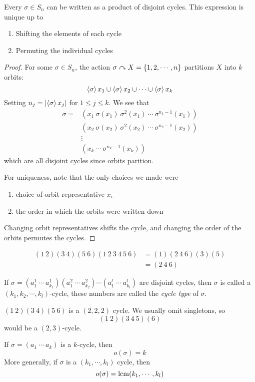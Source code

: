 \documentclass{article}
\begin{document}
\begin{thm}
    Every $\sigma \in S_n$ can be written as a product of disjoint cycles. This expression is unique up to
    \begin{enumerate}
        \item Shifting the elements of each cycle
        \item Permuting the individual cycles
    \end{enumerate}
\end{thm}
\begin{proof}
    For some $\sigma \in S_n$, the action $\sigma \curvearrowright X = \{1, 2, \cdots, n \}$ partitions $X$ into $k$ orbits:
    \[
        \left\langle \sigma\right\rangle x_1 \cup \left\langle \sigma\right\rangle x_2 \cup \cdots \cup \left\langle \sigma\right\rangle x_k
    \]
    Setting $n_j = \left\lvert  \left\langle \sigma\right\rangle x_j \right\rvert$ for $1 \leq j \leq k$. We see that
    \begin{align*}
        \sigma = &(x_1 \ \sigma(x_1) \ \sigma^2(x_1) \  \cdots \ \sigma^{n_1 -1}(x_1)) \\
        &(x_2 \ \sigma(x_2) \ \sigma^2(x_2) \ \cdots \ \sigma^{n_2 - 1}(x_2)) \\
        &\vdots \\
        &(x_k \ \cdots \ \sigma^{n_k - 1}(x_k))
    \end{align*}
    which are all disjoint cycles since orbits parition.

    For uniqueness, note that the only choices we made were
    \begin{enumerate}
        \item choice of orbit representative $x_i$
        \item the order in which the orbits were written down
    \end{enumerate}
    Changing orbit representatives shifts the cycle, and changing the order of the orbits permutes the cycles.
\end{proof}
\begin{eg}
    \begin{align*}
        (1 \ 2)(3 \ 4)(5 \ 6)(1 \ 2 \ 3 \ 4 \ 5 \ 6) &= (1)(2 \ 4 \ 6)(3)(5) \\
        &= (2 \ 4 \ 6)
    \end{align*}
\end{eg}

\begin{defi}
    If $\sigma = (a^1_1\  \cdots\ a^1_{k_1})(a^2_1\ \cdots\ a^2_{k_2}) \cdots (a^l_1\ \cdots\ a^l_{k_l})$ are disjoint cycles, then $\sigma$ is called a $(k_1, k_2, \cdots, k_l)$-cycle,
    these numbers are called the \emph{cycle type} of $\sigma$. 
\end{defi}
\begin{eg}
    $(1\ 2)(3\ 4)(5\ 6)$ is a $(2, 2, 2)$ cycle. We usually omit singletons, so 
    \[
        (1\ 2)(3\ 4\ 5)(6)  
    \]
    would be a $(2, 3)$-cycle.
\end{eg}
\begin{remark}
    If $\sigma = (a_1\ \cdots\ a_k)$ is a $k$-cycle, then
    \[
        o(\sigma) = k  
    \]
    More generally, if $\sigma$ is a $(k_1, \cdots, k_l)$ cycle, then
    \[
        o(\sigma) = \operatorname{lcm}(k_1, \cdots, k_l)  
    \]
\end{remark}
\end{document}
